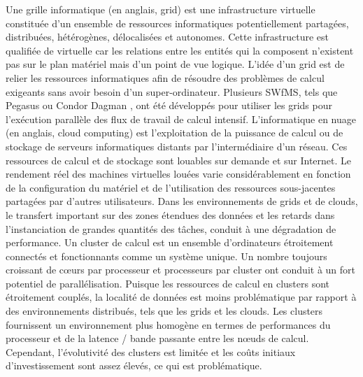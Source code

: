 Une grille informatique (en anglais, grid) est une infrastructure virtuelle constituée d'un ensemble de ressources informatiques potentiellement partagées, distribuées, hétérogènes, délocalisées et autonomes. %
Cette infrastructure est qualifiée de virtuelle car les relations entre les entités qui la composent n'existent pas sur le plan matériel mais d'un point de vue logique. L'idée d'un grid est de relier les ressources informatiques afin de résoudre des problèmes de calcul exigeants sans avoir besoin d'un super-ordinateur. Plusieurs SWfMS, tels que Pegasus \cite{pegasus} ou Condor Dagman \cite{condor}, ont été développés pour utiliser les grids pour l'exécution parallèle des flux de travail de calcul intensif.
L’informatique en nuage (en anglais, cloud computing) %
est l'exploitation de la puissance de calcul ou de stockage de serveurs informatiques distants par l'intermédiaire d'un réseau. Ces ressources de calcul et de stockage sont louables sur demande et sur Internet. Le rendement réel des machines virtuelles louées varie considérablement en fonction de la configuration du matériel et de l'utilisation des ressources sous-jacentes partagées  par d'autres utilisateurs. Dans les environnements de grids et de clouds, le transfert important sur des zones étendues des données et les retards dans l'instanciation de grandes quantités des tâches, conduit à une dégradation de performance. 
Un cluster de calcul est un ensemble d'ordinateurs étroitement connectés et fonctionnants comme un système unique. Un nombre toujours croissant de cœurs par processeur et processeurs par cluster ont conduit à un fort potentiel de parallélisation. Puisque les ressources de calcul en clusters sont étroitement couplés, la localité de données est moins problématique par rapport à des environnements distribués, tels que les grids et les clouds. Les clusters fournissent un environnement plus homogène en termes de performances du processeur et de la latence / bande passante entre les n{\oe}uds de calcul. Cependant, l'évolutivité des clusters est limitée et les coûts initiaux d'investissement sont assez élevés, ce qui est problématique.
